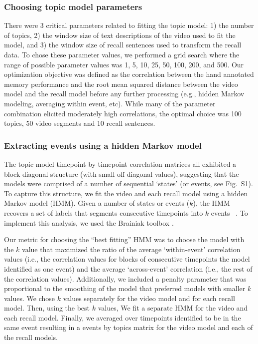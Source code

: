 \documentclass{article}
\begin{document}
\subsubsection*{Choosing topic model parameters}
There were 3 critical parameters related to fitting the topic model: 1) the number of topics, 2) the window size of text descriptions of the video used to fit the model, and 3) the window size of recall sentences used to transform the recall data.  To chose these parameter values, we performed a grid search where the range of possible parameter values was 1, 5, 10, 25, 50, 100, 200, and 500. Our optimization objective was defined as the correlation between the hand annotated memory performance and the root mean squared distance between the video model and the recall model before any further processing (e.g., hidden Markov modeling, averaging within event, etc). While many of the parameter combination elicited moderately high correlations, the optimal choice was 100 topics, 50 video segments and 10 recall sentences.

\subsubsection*{Extracting events using a hidden Markov model}
The topic model timepoint-by-timepoint correlation matrices all exhibited a block-diagonal structure (with small off-diagonal values), suggesting that the models were comprised of a number of sequential `states' (or events, see Fig.~S1). To capture this structure, we fit the video and each recall model using a hidden Markov model (HMM). Given a number of states or events ($k$), the HMM recovers a set of labels that segments consecutive timepoints into $k$ events ~\citep{Rabi89, BaldEtal17}. To implement this analysis, we used the Brainiak toolbox \citep{BaldEtal17, Brainiak}.

Our metric for choosing the ``best fitting'' HMM was to choose the model with the $k$ value that maximized the ratio of the average `within-event' correlation values (i.e., the correlation values for blocks of consecutive timepoints the model identified as one event) and the average `across-event' correlation (i.e., the rest of the correlation values). Additionally, we included a penalty parameter that was proportional to the smoothing of the model that preferred models with smaller $k$ values. We chose $k$ values separately for the video model and for each recall model.  Then, using the best $k$ values, We fit a separate HMM for the video and each recall model. Finally, we averaged over timepoints identified to be in the same event resulting in a events by topics matrix for the video model and each of the recall models.
\end{document}
